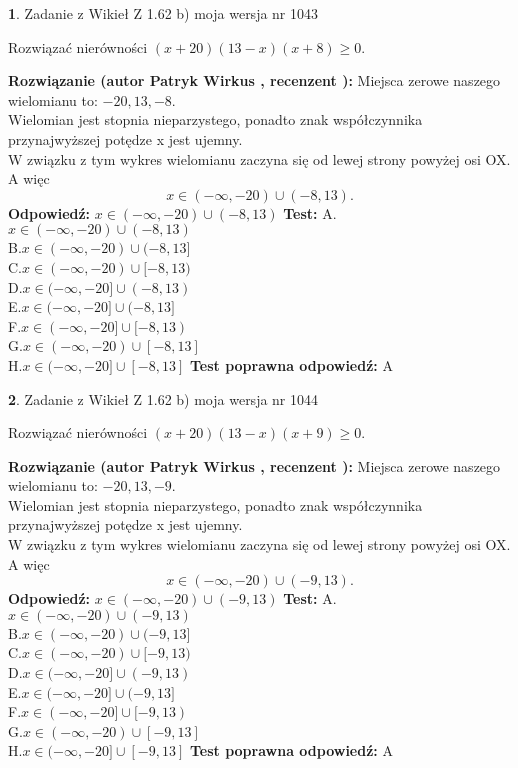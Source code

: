 \documentclass[12pt, a4paper]{article}
\theoremstyle{definition} %
\newtheorem{zad}{}
\newcommand{\zadStart}[1]{\begin{zad}#1\newline}
\newcommand{\zadStop}{\end{zad}}
\newcommand{\rozwStart}[2]{\noindent \textbf{Rozwiązanie (autor #1 , recenzent #2): }\newline}
\newcommand{\rozwStop}{\newline}
\newcommand{\odpStart}{\noindent \textbf{Odpowiedź:}\newline}
\newcommand{\odpStop}{\newline}
\newcommand{\testStart}{\noindent \textbf{Test:}\newline}
\newcommand{\testStop}{\newline}
\newcommand{\kluczStart}{\noindent \textbf{Test poprawna odpowiedź:}\newline}
\newcommand{\kluczStop}{\newline}
\begin{document}
\zadStart{Zadanie z Wikieł Z 1.62 b) moja wersja nr 1043}

Rozwiązać nierówności $(x+20)(13-x)(x+8)\ge0$.
\zadStop
\rozwStart{Patryk Wirkus}{}
Miejsca zerowe naszego wielomianu to: $-20, 13, -8$.\\
Wielomian jest stopnia nieparzystego, ponadto znak współczynnika przy\linebreak najwyższej potędze x jest ujemny.\\ W związku z tym wykres wielomianu zaczyna się od lewej strony powyżej osi OX. A więc $$x \in (-\infty,-20) \cup (-8,13).$$
\rozwStop
\odpStart
$x \in (-\infty,-20) \cup (-8,13)$
\odpStop
\testStart
A.$x \in (-\infty,-20) \cup (-8,13)$\\
B.$x \in (-\infty,-20) \cup (-8,13]$\\
C.$x \in (-\infty,-20) \cup [-8,13)$\\
D.$x \in (-\infty,-20] \cup (-8,13)$\\
E.$x \in (-\infty,-20] \cup (-8,13]$\\
F.$x \in (-\infty,-20] \cup [-8,13)$\\
G.$x \in (-\infty,-20) \cup [-8,13]$\\
H.$x \in (-\infty,-20] \cup [-8,13]$
\testStop
\kluczStart
A
\kluczStop



\zadStart{Zadanie z Wikieł Z 1.62 b) moja wersja nr 1044}

Rozwiązać nierówności $(x+20)(13-x)(x+9)\ge0$.
\zadStop
\rozwStart{Patryk Wirkus}{}
Miejsca zerowe naszego wielomianu to: $-20, 13, -9$.\\
Wielomian jest stopnia nieparzystego, ponadto znak współczynnika przy\linebreak najwyższej potędze x jest ujemny.\\ W związku z tym wykres wielomianu zaczyna się od lewej strony powyżej osi OX. A więc $$x \in (-\infty,-20) \cup (-9,13).$$
\rozwStop
\odpStart
$x \in (-\infty,-20) \cup (-9,13)$
\odpStop
\testStart
A.$x \in (-\infty,-20) \cup (-9,13)$\\
B.$x \in (-\infty,-20) \cup (-9,13]$\\
C.$x \in (-\infty,-20) \cup [-9,13)$\\
D.$x \in (-\infty,-20] \cup (-9,13)$\\
E.$x \in (-\infty,-20] \cup (-9,13]$\\
F.$x \in (-\infty,-20] \cup [-9,13)$\\
G.$x \in (-\infty,-20) \cup [-9,13]$\\
H.$x \in (-\infty,-20] \cup [-9,13]$
\testStop
\kluczStart
A
\kluczStop
\end{document}
